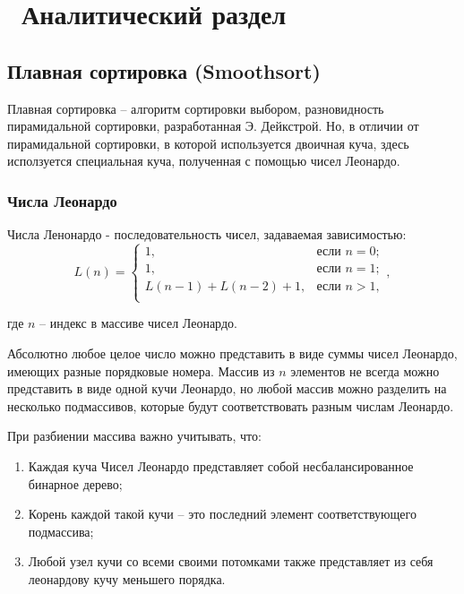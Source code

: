 \chapter{ Аналитический раздел}
\label{cha:analytical}
    \section{Плавная сортировка (Smoothsort)}
\par Плавная сортировка -- алгоритм сортировки выбором, разновидность пирамидальной сортировки, разработанная Э. Дейкстрой. Но, в отличии от пирамидальной сортировки, в которой используется двоичная куча, здесь исползуется специальная куча, полученная с помощью чисел Леонардо.
	\subsection*{Числа Леонардо}
\par Числа Ленонардо - последовательность чисел, задаваемая зависимостью:
	\begin{equation}\label{formula:LeoNumbers}
	L(n) = \begin{cases}
		1, &\text{если } n = 0;\\
		1, &\text{если } n = 1;\\
		L(n-1) + L(n-2) + 1, &\text{если } n > 1,\\
	\end{cases},
\end{equation} \par где \begin{math}n\end{math} -- индекс в массиве чисел Леонардо.
	\par Абсолютно любое целое число можно представить в виде суммы чисел Леонардо, имеющих разные порядковые номера. Массив из \begin{math}n\end{math} элементов не всегда можно представить в виде одной кучи Леонардо, но любой массив можно разделить на несколько подмассивов, которые будут соответствовать разным числам Леонардо.
	\par При разбиении массива важно учитывать, что:
	\begin{enumerate}
		\item Каждая куча Чисел Леонардо представляет собой несбалансированное бинарное дерево;
		\item Корень каждой такой кучи -- это последний элемент соответствующего подмассива;
		\item Любой узел кучи со всеми своими потомками также представляет из себя леонардову кучу меньшего порядка. 
	\end{enumerate}
